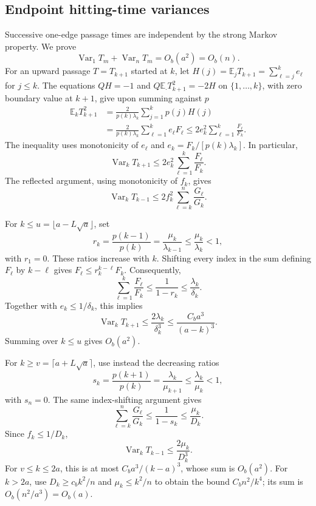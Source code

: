 \subsection{Endpoint hitting-time variances}
Successive one-edge passage times are independent by the strong Markov
property. We prove
\[
 \operatorname{Var}_1T_m+\operatorname{Var}_nT_m=O_b(a^2)=O_b(n).
\]
For an upward passage $T=T_{k+1}$ started at $k$, let
$H(j)=\mathbb E_jT_{k+1}=\sum_{\ell=j}^{k}e_\ell$ for $j\leq k$.
The equations $QH=-1$ and
$Q\mathbb E_{\cdot}T_{k+1}^2=-2H$ on $\{1,\ldots,k\}$,
with zero boundary value at $k+1$, give upon summing against $p$
\begin{align*}
 \mathbb E_kT_{k+1}^2
 &=\frac2{p(k)\lambda_k}\sum_{j=1}^{k}p(j)H(j)\\
 &=\frac2{p(k)\lambda_k}\sum_{\ell=1}^{k}e_\ell F_\ell
 \leq2e_k^2\sum_{\ell=1}^{k}\frac{F_\ell}{F_k}.
\end{align*}
The inequality uses monotonicity of $e_\ell$ and
$e_k=F_k/[p(k)\lambda_k]$. In particular,
\begin{equation}\label{eq:upward-variance-bound}
 \operatorname{Var}_kT_{k+1}
 \leq2e_k^2\sum_{\ell=1}^{k}\frac{F_\ell}{F_k}.
\end{equation}
The reflected argument, using monotonicity of $f_k$, gives
\begin{equation}\label{eq:downward-variance-bound}
 \operatorname{Var}_kT_{k-1}
 \leq2f_k^2\sum_{\ell=k}^{n}\frac{G_\ell}{G_k}.
\end{equation}

For $k\leq u=\lfloor a-L\sqrt a\rfloor$, set
\[
 r_k=\frac{p(k-1)}{p(k)}
     =\frac{\mu_k}{\lambda_{k-1}}
     \leq\frac{\mu_k}{\lambda_k}<1,
\]
with $r_1=0$. These ratios increase with $k$. Shifting every index in
the sum defining $F_\ell$ by $k-\ell$ gives
$F_\ell\leq r_k^{k-\ell}F_k$. Consequently,
\[
 \sum_{\ell=1}^{k}\frac{F_\ell}{F_k}
 \leq\frac1{1-r_k}\leq\frac{\lambda_k}{\delta_k}.
\]
Together with $e_k\leq1/\delta_k$, this implies
\[
 \operatorname{Var}_kT_{k+1}
 \leq\frac{2\lambda_k}{\delta_k^3}
 \leq\frac{C_ba^3}{(a-k)^3}.
\]
Summing over $k\leq u$ gives $O_b(a^2)$.

For $k\geq v=\lceil a+L\sqrt a\rceil$, use instead the decreasing
ratios
\[
 s_k=\frac{p(k+1)}{p(k)}
     =\frac{\lambda_k}{\mu_{k+1}}
     \leq\frac{\lambda_k}{\mu_k}<1,
\]
with $s_n=0$. The same index-shifting argument gives
\[
 \sum_{\ell=k}^{n}\frac{G_\ell}{G_k}
 \leq\frac1{1-s_k}\leq\frac{\mu_k}{D_k}.
\]
Since $f_k\leq1/D_k$,
\[
 \operatorname{Var}_kT_{k-1}
 \leq\frac{2\mu_k}{D_k^3}.
\]
For $v\leq k\leq2a$, this is at most
$C_ba^3/(k-a)^3$, whose sum is $O_b(a^2)$.
For $k>2a$, use $D_k\geq c_bk^2/n$ and $\mu_k\leq k^2/n$
to obtain the bound $C_bn^2/k^4$; its sum is
$O_b(n^2/a^3)=O_b(a)$.

